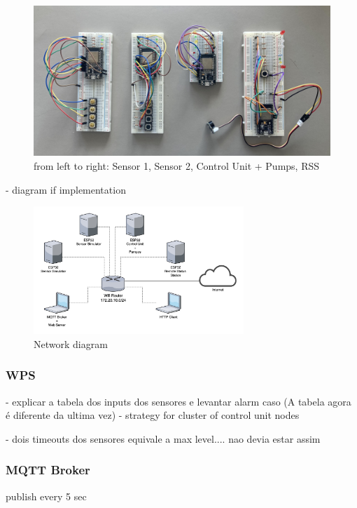 \documentclass[11pt]{article}
\begin{document}
\begin{figure}[H]
  \centering
  \includegraphics[width=\linewidth]{../diagrams/hardware.jpg}
  \caption{from left to right: Sensor 1, Sensor 2, Control Unit + Pumps, RSS}
  \label{fig:hardware}
\end{figure}

- diagram if implementation

\begin{figure}[H]
  \centering
  \includegraphics[width=300px]{../diagrams/network-diagram.jpg}
  \caption{Network diagram}
  \label{fig:network-diagram}
\end{figure}

\subsubsection{WPS}

- explicar a tabela dos inputs dos sensores e levantar alarm caso (A tabela agora é diferente da ultima vez)
- strategy for cluster of control unit nodes

- dois timeouts dos sensores equivale a max level.... nao devia estar assim

\subsubsection{MQTT Broker}

publish every 5 sec
\end{document}
